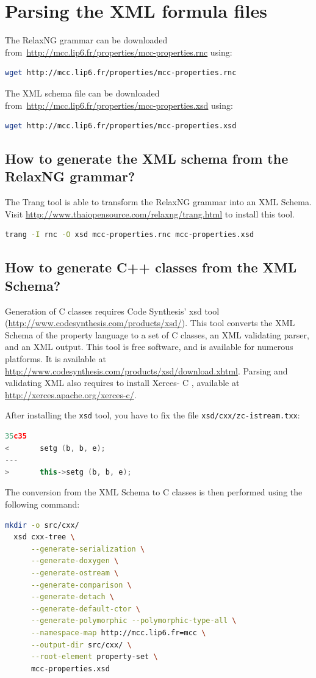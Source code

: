\documentclass[10pt,english,a4paper]{article}
\newcommand{\CC}{%
  C\nolinebreak\hspace{-.05em}\raisebox{.4ex}{\scriptsize\bf +}\nolinebreak\hspace{-.10em}\raisebox{.4ex}{\scriptsize\bf +}%
}
\newcommand\mysection[1]{\color{sectioncolor}\section{#1}\color{defaultcolor}}
\newcommand\mysubsection[1]{\color{sectioncolor}\subsection{#1}\color{defaultcolor}}
\begin{document}
\iffalse
\mysection{Parsing the XML formula files}
\label{s:parsing}

The RelaxNG grammar can be downloaded from~\url{http://mcc.lip6.fr/properties/mcc-properties.rnc} using:
\begin{lstlisting}[language=sh]
  wget http://mcc.lip6.fr/properties/mcc-properties.rnc
\end{lstlisting}

The XML schema file can be downloaded from~\url{http://mcc.lip6.fr/properties/mcc-properties.xsd} using:
\begin{lstlisting}[language=sh]
  wget http://mcc.lip6.fr/properties/mcc-properties.xsd
\end{lstlisting}

\mysubsection{How to generate the XML schema from the RelaxNG grammar?}
The Trang tool is able to transform the RelaxNG grammar into an XML Schema.
Visit \url{http://www.thaiopensource.com/relaxng/trang.html} to install this tool.

\begin{lstlisting}[language=sh]
  trang -I rnc -O xsd mcc-properties.rnc mcc-properties.xsd
\end{lstlisting}

\mysubsection{How to generate C++ classes from the XML Schema?}
Generation of {\CC} classes requires Code Synthesis' xsd tool
(\url{http://www.codesynthesis.com/products/xsd/}).
This tool converts the XML Schema of the property language to a set of \CC{} classes,
an XML validating parser, and an XML output.
This tool is free software, and is available for numerous platforms.
It is available at \url{http://www.codesynthesis.com/products/xsd/download.xhtml}.
Parsing and validating XML also requires to install Xerces-\CC{},
available at \url{http://xerces.apache.org/xerces-c/}.

After installing the \lstinline!xsd! tool,
you have to fix the file \lstinline!xsd/cxx/zc-istream.txx!:
\begin{lstlisting}[language=C++]
35c35
<       setg (b, b, e);
---
>       this->setg (b, b, e);
\end{lstlisting}

The conversion from the XML Schema to \CC{} classes is then performed using the following command:
\begin{lstlisting}[language=sh]
  mkdir -o src/cxx/
  xsd cxx-tree \
      --generate-serialization \
      --generate-doxygen \
      --generate-ostream \
      --generate-comparison \
      --generate-detach \
      --generate-default-ctor \
      --generate-polymorphic --polymorphic-type-all \
      --namespace-map http://mcc.lip6.fr=mcc \
      --output-dir src/cxx/ \
      --root-element property-set \
      mcc-properties.xsd
\end{lstlisting}
\end{document}
